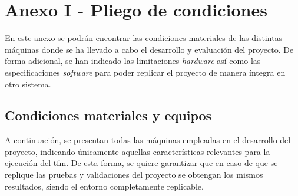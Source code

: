\chapter{Anexo I - Pliego de condiciones}


En este anexo se podrán encontrar las condiciones materiales de las distintas máquinas donde se ha llevado a cabo el desarrollo y evaluación del proyecto. De forma adicional, se han indicado las limitaciones \textit{hardware} así como las especificaciones \textit{software} para poder replicar el proyecto de manera íntegra en otro sistema.


\section{Condiciones materiales y equipos}


A continuación, se presentan todas las máquinas empleadas en el desarrollo del proyecto, indicando únicamente aquellas características relevantes para la ejecución del \gls{tfm}. De esta forma, se quiere garantizar que en caso de que se replique las pruebas y validaciones del proyecto se obtengan los mismos resultados, siendo el entorno completamente replicable.

